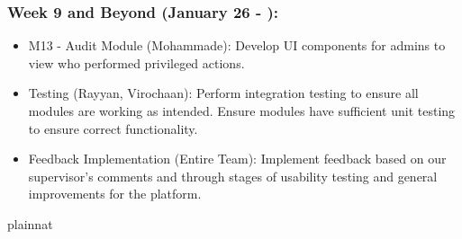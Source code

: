\documentclass[12pt, titlepage]{article}
\begin{document}
\subsubsection*{Week 9 and Beyond (January 26 - ):} 
\begin{itemize}
  \item M13 - Audit Module (Mohammade): Develop UI components for admins to view who performed privileged actions.  
  \item Testing (Rayyan, Virochaan): Perform integration testing to ensure all modules are working as intended. Ensure modules have sufficient unit testing to ensure correct functionality. 
  \item Feedback Implementation (Entire Team): Implement feedback based on our supervisor's comments and through stages of usability testing and general improvements for the platform.
\end{itemize}
 {plainnat}


\newpage{}
\end{document}

